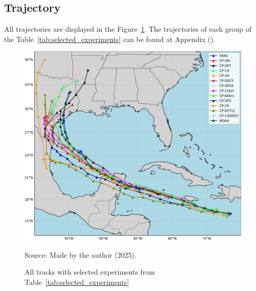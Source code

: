 \subsection{Trajectory}


All trajectories are displayed in the Figure~\ref{fig:all_tracks_selected}. The trajectories of each group of the Table~\ref{tab:selected_experiments} can be found at Appendix ().

\begin{figure}[!ht]
    \centering
    \caption{All tracks with selected experiments from Table~\ref{tab:selected_experiments}} %
    \includegraphics[width=\textwidth]{docs/figuras/chapter5/ALL_tracks_filter.png} 
    \vspace{0.5em}
    
    Source: Made by the author (2025). %
    \label{fig:all_tracks_selected} %
\end{figure}